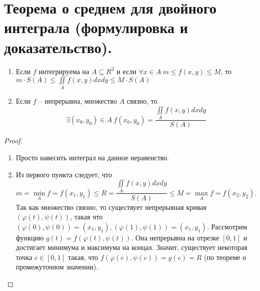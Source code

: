 \section{Теорема о среднем для двойного интеграла (формулировка и доказательство).}

\begin{theorem}
    \text{} \newline
    \begin{enumerate}
        \item Если $f$ интегрируема на $A \subseteq R^2$ и если $\forall x \in A \> m \leqslant f(x,y) \leqslant M$, то $m \cdot S(A) \leqslant \iint \limits_{A} f(x,y) dx dy \leqslant M \cdot S(A)$
        \item Если $f$ -- непрерывна, множество $A$ связно, то
        \[
            \exists (x_0, y_0) \in A \> f(x_0, y_0) =
            \frac{
                \iint \limits_A f(x,y) dx dy
            }{ S(A) }
        \]
    \end{enumerate}
    \begin{proof}
        \text{} \newline
        \begin{enumerate}
            \item Просто навесить интеграл на данное неравенство.
            \item Из первого пункта следует, что
            \[
                m = \min_A f = f(x_1, y_1) \leqslant R = \frac{
                    \iint \limits_A f(x,y) dx dy
                }{ S(A) } \leqslant M = \max_A f = f(x_2, y_2).
            \]
            Так как множество связно, то существует непрерывная кривая $(\varphi(t), \psi(t))$, такая что $(\varphi(0), \psi(0)) = (x_1, y_1), (\varphi(1), \psi(1)) = (x_1, y_1)$. Рассмотрим функцию $g(t) = f(\varphi(t), \psi(t))$. Она непрерывна на отрезке $[0,1]$ и достигает минимума и максимума на концах. Значит, существует некоторая точка $c \in [0, 1]$ такая, что $f(\varphi(c), \psi(c)) = g(c) = R$ (по теореме о промежуточном значении).
        \end{enumerate}
    \end{proof}
\end{theorem}